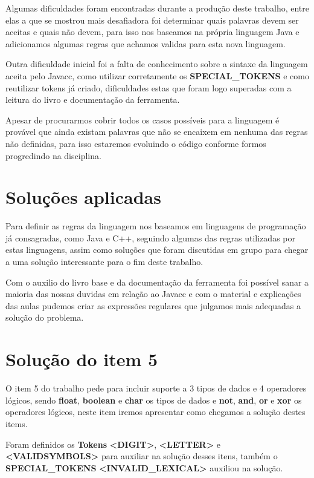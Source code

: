 \documentclass[
	article,			%
	11pt,				%
	oneside,			%
	a4paper,			%
	portuguese,			%
	brazil,				%
	sumario=tradicional
	]{abntex2}
\begin{document}
Algumas dificuldades foram encontradas durante a produção deste trabalho, entre elas a que se mostrou mais desafiadora foi determinar quais palavras devem ser aceitas e 
quais não devem, para isso nos baseamos na própria linguagem Java e adicionamos algumas regras que achamos validas para esta nova linguagem.

Outra dificuldade inicial foi a falta de conhecimento sobre a sintaxe da linguagem aceita pelo Javacc, como utilizar corretamente os \textbf{SPECIAL\_TOKENS} e como reutilizar tokens
já criado, dificuldades estas que foram logo superadas com a leitura do livro e documentação da ferramenta.

Apesar de procurarmos cobrir todos os casos possíveis para a linguagem é provável que ainda existam palavras que não se encaixem em nenhuma das regras não definidas,
para isso estaremos evoluindo o código conforme formos progredindo na disciplina.

\section{Soluções aplicadas}

Para definir as regras da linguagem nos baseamos em linguagens de programação já consagradas, como Java e C++, seguindo algumas das regras utilizadas por estas
linguagens, assim como soluções que foram discutidas em grupo para chegar a uma solução interessante para o fim deste trabalho.

Com o auxilio do livro base e da documentação da ferramenta foi possível  sanar a maioria das nossas duvidas em relação ao Javacc e com o material e explicações das aulas
pudemos criar as expressões regulares que julgamos mais adequadas a solução do problema.

\section{Solução do item 5}

O item 5 do trabalho pede para incluir suporte a 3 tipos de dados e 4 operadores lógicos, sendo \textbf{float}, \textbf{boolean} e \textbf{char} os tipos de dados 
e \textbf{not}, \textbf{and}, \textbf{or} e \textbf{xor} os operadores lógicos, neste item iremos apresentar como chegamos a solução destes items.

Foram definidos os \textbf{Tokens} \textbf{<DIGIT>}, \textbf{<LETTER>} e \textbf{<VALIDSYMBOLS>} para auxiliar na solução desses itens, também o \textbf{SPECIAL\_TOKENS} 
\textbf{<INVALID\_LEXICAL>} auxiliou na solução.
\end{document}
